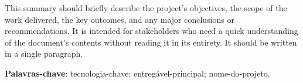 

\begin{resumo}[Resumo]

  This summary should briefly describe the project's objectives, the scope of the work delivered, the key outcomes, and any major conclusions or recommendations. It is intended for stakeholders who need a quick understanding of the document's contents without reading it in its entirety. It should be written in a single paragraph.

  \vspace{\onelineskip} %
  \noindent %
  \textbf{Palavras-chave}: tecnologia-chave; entregável-principal; nome-do-projeto.
\end{resumo}



